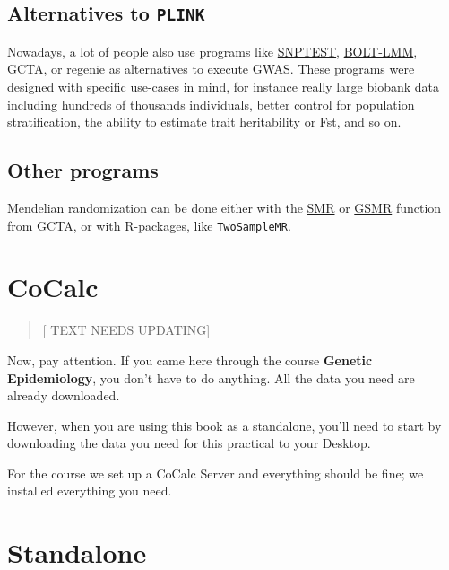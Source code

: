 \documentclass[
]{book}
\newcommand{\passthrough}[1]{#1}
\begin{document}
\hypertarget{alternatives-to-plink}{%
\subsection{\texorpdfstring{Alternatives to \texttt{PLINK}}{Alternatives to PLINK}}\label{alternatives-to-plink}}

Nowadays, a lot of people also use programs like \href{snptest}{SNPTEST}, \href{https://data.broadinstitute.org/alkesgroup/BOLT-LMM/}{BOLT-LMM}, \href{http://cnsgenomics.com/software/gcta/\#Overview}{GCTA}, or \href{https://rgcgithub.github.io/regenie/}{regenie} as alternatives to execute GWAS. These programs were designed with specific use-cases in mind, for instance really large biobank data including hundreds of thousands individuals, better control for population stratification, the ability to estimate trait heritability or Fst, and so on.

\hypertarget{other-programs}{%
\subsection{Other programs}\label{other-programs}}

Mendelian randomization can be done either with the \href{http://cnsgenomics.com/software/smr/\#Overview}{SMR} or \href{http://cnsgenomics.com/software/gsmr/}{GSMR} function from GCTA, or with R-packages, like \href{https://mrcieu.github.io/TwoSampleMR/}{\passthrough{\lstinline!TwoSampleMR!}}.

\hypertarget{cocalc}{%
\section{CoCalc}\label{cocalc}}

\begin{quote}
{[} TEXT NEEDS UPDATING{]}
\end{quote}

Now, pay attention. If you came here through the course \textbf{Genetic Epidemiology}, you don't have to do anything. All the data you need are already downloaded.

However, when you are using this book as a standalone, you'll need to start by downloading the data you need for this practical to your Desktop.

For the course we set up a CoCalc Server and everything should be fine; we installed everything you need.

\hypertarget{standalone}{%
\section{Standalone}\label{standalone}}
\end{document}

